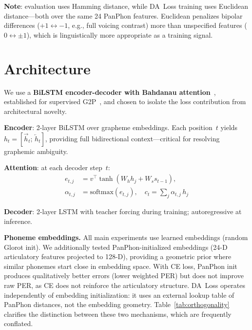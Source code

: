 \documentclass[conference]{IEEEtran}
\begin{document}
\textbf{Note}: evaluation uses Hamming distance, while DA~Loss
training uses Euclidean distance---both over the same 24 PanPhon
features.
Euclidean penalizes bipolar differences ($+1 \leftrightarrow -1$,
e.g., full voicing contrast) more than unspecified features
($0 \leftrightarrow \pm 1$), which is linguistically more
appropriate as a training signal.

\section{Architecture}

We use a \textbf{BiLSTM encoder-decoder with Bahdanau
attention}~\cite{bahdanau2014neural}, established for supervised
G2P~\cite{rao2015g2p}, and chosen to isolate the loss contribution
from architectural novelty.

\textbf{Encoder}: 2-layer BiLSTM over grapheme embeddings.
Each position~$t$ yields $h_t\!=\![\overrightarrow{h}_t;\,
\overleftarrow{h}_t]$, providing full bidirectional context---critical
for resolving graphemic ambiguity.

\textbf{Attention}: at each decoder step~$t$:
\begin{align}
  e_{t,j} &= v^\top \tanh(W_h h_j + W_s s_{t-1}), \nonumber \\
  \alpha_{t,j} &= \mathrm{softmax}(e_{t,j}), \quad
  c_t = \textstyle\sum_j \alpha_{t,j}\, h_j
  \label{eq:attention}
\end{align}

\textbf{Decoder}: 2-layer LSTM with teacher forcing during training;
autoregressive at inference.

\textbf{Phoneme embeddings.}
All main experiments use learned embeddings (random Glorot init).
We additionally tested PanPhon-initialized embeddings (24-D
articulatory features projected to 128-D), providing a geometric
prior where similar phonemes start close in embedding space.
With CE loss, PanPhon init produces qualitatively better errors
(lower weighted PER) but does not improve raw PER, as CE does not
reinforce the articulatory structure.
DA~Loss operates independently of embedding initialization: it uses
an external lookup table of PanPhon distances, not the embedding
geometry.
Table~\ref{tab:orthogonality} clarifies the distinction between
these two mechanisms, which are frequently conflated.
\end{document}

